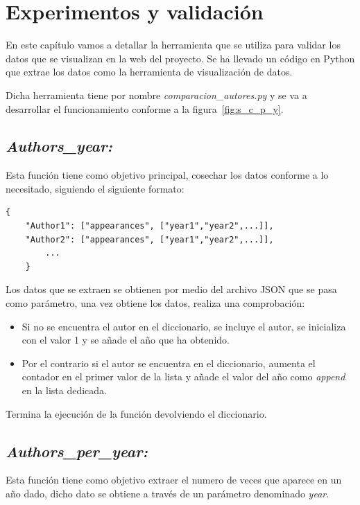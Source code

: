 \documentclass[a4paper, 12pt]{book}
\begin{document}

\cleardoublepage
\chapter{Experimentos y validación}
\label{chap:experimentos}

En este capítulo vamos a detallar la herramienta que se utiliza para validar los datos que se visualizan en la web del proyecto. Se ha llevado un código en Python que extrae los datos como la herramienta de visualización de datos.

Dicha herramienta tiene por nombre \textit{comparacion\_autores.py} y se va a desarrollar el funcionamiento conforme a la figura~\ref{fig:s_c_p_y}.
\section{\textit{Authors\_year:}}
Esta función tiene como objetivo principal, cosechar los datos conforme a lo necesitado, siguiendo el siguiente formato:
\begin{lstlisting}
{
    "Author1": ["appearances", ["year1","year2",...]],
    "Author2": ["appearances", ["year1","year2",...]],
        ...
    }
\end{lstlisting}

Los datos que se extraen se obtienen por medio del archivo JSON que se pasa como parámetro, una vez obtiene los datos, realiza una comprobación:
\begin{itemize}
    \item Si no se encuentra el autor en el diccionario, se incluye el autor, se inicializa con el valor 1 y se añade el año que ha obtenido.
    \item Por el contrario si el autor se encuentra en el diccionario, aumenta el contador en el primer valor de la lista y añade el valor del año como \textit{append} en la lista dedicada.
\end{itemize}

Termina la ejecución de la función devolviendo el diccionario.

\section{\textit{Authors\_per\_year:}}
Esta función tiene como objetivo extraer el numero de veces que aparece en un año dado, dicho dato se obtiene a través de un parámetro denominado \textit{year}.
\end{document}
